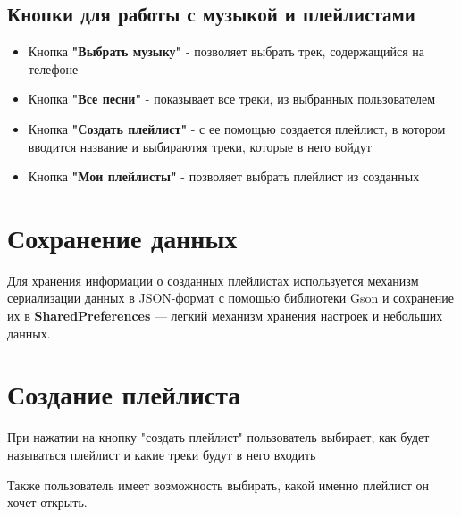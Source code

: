 \subsection{Кнопки для работы с музыкой и плейлистами}

    \begin{itemize}
    \item Кнопка \textbf{"Выбрать музыку"} - позволяет выбрать трек, содержащийся на телефоне
    \item Кнопка \textbf{"Все песни"} - показывает все треки, из выбранных пользователем
    \item Кнопка \textbf{"Создать плейлист"} - с ее помощью создается плейлист, в котором вводится название и выбираютяя треки, которые в него войдут
    \item Кнопка \textbf{"Мои плейлисты"} - позволяет выбрать плейлист из созданных
    \end{itemize}
          
\section{Сохранение данных}


Для хранения информации о созданных плейлистах используется механизм сериализации данных в JSON-формат с помощью библиотеки Gson и сохранение их в \textbf{SharedPreferences} — легкий механизм хранения настроек и небольших данных.

\section{Создание плейлиста}

    При нажатии на кнопку "создать плейлист" пользователь выбирает, как будет называться плейлист и какие треки будут в него входить

    Также пользователь имеет возможность выбирать, какой именно плейлист он хочет открыть.

\endinput